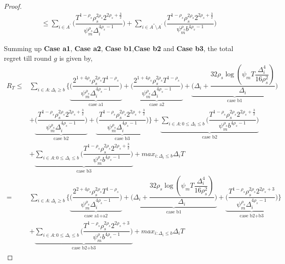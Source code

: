 \begin{proof}
\begin{align*}
&\leq\sum_{i\in A^{'}}\bigg(\dfrac{T^{1-\rho_{s}}\rho_{s}^{2\rho_{s}}2^{2\rho_{s}+\frac{3}{2}}}{\psi_{m}^{\rho_{s}}\Delta_{i}^{4\rho_{s}-1}} \bigg)+\sum_{i\in A^{''}\setminus A^{'}}\bigg(\dfrac{T^{1-\rho_{s}}\rho_{s}^{2\rho_{s}}2^{2\rho_{s}+\frac{3}{2}}}{\psi_{m}^{\rho_{s}}b^{4\rho_{s}-1}} \bigg)
\end{align*}
 
Summing up \textbf{Case a1}, \textbf{Case a2}, \textbf{Case b1},\textbf{Case b2} and \textbf{Case b3}, the total regret till round $g$ is given by,
\begin{align*}
	R_{T} \leq & \sum_{i\in A:\Delta_{i}\geq b}\bigg\lbrace\underbrace{\bigg(\dfrac{2^{1+4\rho_{s}}\rho_{s}^{2\rho_{s}}T^{1-\rho_{s}}}{\psi_{m}^{\rho_{s}}\Delta_{i}^{4\rho_{s}-1}}\bigg)}_{\text{case a1}} + \underbrace{\bigg(\dfrac{2^{1+4\rho_{s}}\rho_{s}^{2\rho_{s}}T^{1-\rho_{s}}}{\psi_{m}^{\rho_{s}}\Delta_{i}^{4\rho_{s}-1}}\bigg)}_{\text{case a2}} + \underbrace{\bigg(\Delta_{i}+\dfrac{32\rho_{s}\log{(\psi_{m}T\dfrac{\Delta_{i}^{4}}{16\rho_{s}^{2}})}}{\Delta_{i}}\bigg)}_{\text{case b1}} \\
	& + \underbrace{\bigg(\dfrac{T^{1-\rho_{s}}\rho_{s}^{2\rho_{s}}2^{2\rho_{s}+\frac{3}{2}}}{\psi_{m}^{\rho_{s}}\Delta_{i}^{4\rho_{s} -1}} \bigg)}_{\text{case b2}} + \underbrace{\bigg(\dfrac{T^{1-\rho_{s}}\rho_{s}^{2\rho_{s}}2^{2\rho_{s}+\frac{3}{2}}}{\psi_{m}^{\rho_{s}}\Delta_{i}^{4\rho_{s} -1}} \bigg)}_{\text{case b3}}\bigg \rbrace+\underbrace{\sum_{i\in A:0\leq\Delta_{i}\leq b}\bigg(\dfrac{T^{1-\rho_{s}}\rho_{s}^{2\rho_{s}}2^{2\rho_{s}+\frac{3}{2}}}{\psi_{m}^{\rho_{s}}b^{4\rho_{s} -1}} \bigg)}_{\text{case b2}} \\
   &	+ \underbrace{\sum_{i\in A:0\leq\Delta_{i}\leq b}\bigg(\dfrac{T^{1-\rho_{s}}\rho_{s}^{2\rho_{s}}2^{2\rho_{s}+\frac{3}{2}}}{\psi_{m}^{\rho_{s}}b^{4\rho_{s} -1}} \bigg)}_{\text{case b3}} + max_{i:\Delta_{i}\leq b}\Delta_{i}T\\
  = & \sum\limits_{i\in A:\Delta_{i}\geq b}\bigg\lbrace\underbrace{\bigg(\dfrac{2^{2+4\rho_{s}}\rho_{s}^{2\rho_{s}}T^{1-\rho_{s}}}{\psi_{m}^{\rho_{s}}\Delta_{i}^{4\rho_{s}-1}}\bigg)}_{\text{case a1+a2}} + \underbrace{\bigg(\Delta_{i}+\dfrac{32\rho_{s}\log{(\psi_{m}T\dfrac{\Delta_{i}^{4}}{16\rho_{s}^{2}})}}{\Delta_{i}}\bigg)}_{\text{case b1}}  +  \underbrace{\bigg(\dfrac{T^{1-\rho_{s}}\rho_{s}^{2\rho_{s}}2^{2\rho_{s}+3}}{\psi_{m}^{\rho_{s}}\Delta_{i}^{4\rho_{s} -1}} \bigg)}_{\text{case b2+b3}}\bigg \rbrace \\
  & +\underbrace{\sum\limits_{i\in A:0\leq\Delta_{i}\leq b}\bigg(\dfrac{T^{1-\rho_{s}}\rho_{s}^{2\rho_{s}}2^{2\rho_{s}+3}}{\psi_{m}^{\rho_{s}}b^{4\rho_{s} -1}} \bigg)}_{\text{case b2+b3}} + max_{i:\Delta_{i}\leq b}\Delta_{i}T
\end{align*}
  
\end{proof}

